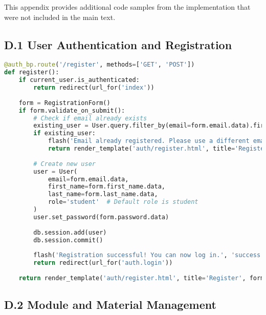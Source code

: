 This appendix provides additional code samples from the implementation that were not included in the main text.

\subsection*{D.1 User Authentication and Registration}

\begin{lstlisting}[language=Python, caption=User Registration Implementation]
@auth_bp.route('/register', methods=['GET', 'POST'])
def register():
    if current_user.is_authenticated:
        return redirect(url_for('index'))
        
    form = RegistrationForm()
    if form.validate_on_submit():
        # Check if email already exists
        existing_user = User.query.filter_by(email=form.email.data).first()
        if existing_user:
            flash('Email already registered. Please use a different email.', 'danger')
            return render_template('auth/register.html', title='Register', form=form)
            
        # Create new user
        user = User(
            email=form.email.data,
            first_name=form.first_name.data,
            last_name=form.last_name.data,
            role='student'  # Default role is student
        )
        user.set_password(form.password.data)
        
        db.session.add(user)
        db.session.commit()
        
        flash('Registration successful! You can now log in.', 'success')
        return redirect(url_for('auth.login'))
        
    return render_template('auth/register.html', title='Register', form=form)
\end{lstlisting}

\subsection*{D.2 Module and Material Management}

